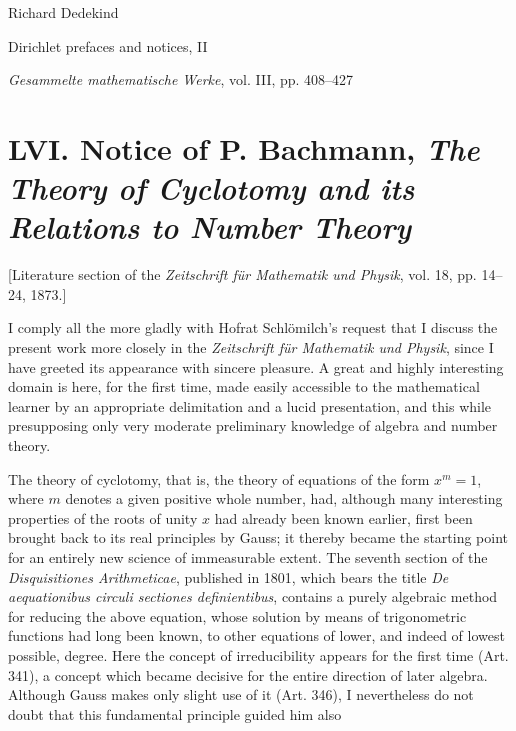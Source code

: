 \documentclass[11pt]{article}
\newcommand{\origpage}[1]{\par\vspace{0.25em}\noindent{\footnotesize\itshape [Printed page #1]}\par\vspace{0.25em}}
\begin{document}
\begin{center}
{\Large Richard Dedekind}\par\vspace{0.3em}
{\large Dirichlet prefaces and notices, II}\par\vspace{0.2em}
{\normalsize \textit{Gesammelte mathematische Werke}, vol. III, pp. 408--427}\par
\end{center}
\vspace{0.7em}

\origpage{408}
\section*{LVI. Notice of P. Bachmann, \textit{The Theory of Cyclotomy and its Relations to Number Theory}}
\begin{center}\small [Literature section of the \textit{Zeitschrift für Mathematik und Physik}, vol. 18, pp. 14--24, 1873.]\end{center}

I comply all the more gladly with Hofrat Schlömilch's request that I discuss the present work more closely in the \textit{Zeitschrift für Mathematik und Physik}, since I have greeted its appearance with sincere pleasure. A great and highly interesting domain is here, for the first time, made easily accessible to the mathematical learner by an appropriate delimitation and a lucid presentation, and this while presupposing only very moderate preliminary knowledge of algebra and number theory.

The theory of cyclotomy, that is, the theory of equations of the form $x^m=1$, where $m$ denotes a given positive whole number, had, although many interesting properties of the roots of unity $x$ had already been known earlier, first been brought back to its real principles by Gauss; it thereby became the starting point for an entirely new science of immeasurable extent. The seventh section of the \textit{Disquisitiones Arithmeticae}, published in 1801, which bears the title \textit{De aequationibus circuli sectiones definientibus}, contains a purely algebraic method for reducing the above equation, whose solution by means of trigonometric functions had long been known, to other equations of lower, and indeed of lowest possible, degree. Here the concept of irreducibility appears for the first time (Art. 341), a concept which became decisive for the entire direction of later algebra. Although Gauss makes only slight use of it (Art. 346), I nevertheless do not doubt that this fundamental principle guided him also
\end{document}
